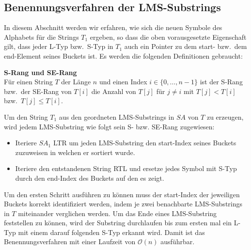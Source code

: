 \subsection{ Benennungsverfahren der LMS-Substrings}

In diesem Abschnitt werden wir erfahren, wie sich die neuen Symbole des Alphabets für die Strings $T_1$ ergeben, so dass die oben vorausgesetzte Eigenschaft gilt, dass jeder L-Typ bzw.\ S-Typ in $T_1$ auch ein Pointer zu dem start- bzw.\ dem end-Element seines Buckets ist. Es werden die folgenden Definitionen gebraucht:

\begin{definition}\textbf{S-Rang und SE-Rang}\\
Für einen String $T$ der Länge $n$ und einen Index $i \in \{0, \ldots, n-1\}$ ist der S-Rang bzw.\ der SE-Rang von $T[i]$ die Anzahl von $T[j]$ für $j \neq i$ mit $T[j] < T[i]$ bzw.\ $T[j] \leq T[i]$. 
\end{definition}

Um den String $T_1$ aus den geordneten LMS-Substrings in $SA$ von $T$ zu erzeugen, wird jedem LMS-Substring wie folgt sein S- bzw. SE-Rang zugewiesen:

\begin{itemize}
\item Iteriere $SA_1$ LTR um jeden LMS-Substring den start-Index seines Buckets zuzuweisen in welchen er sortiert wurde.
\item Iteriere den entstandenen String RTL und ersetze jedes Symbol mit S-Typ durch den end-Index des Buckets auf den es zeigt.
\end{itemize}

Um den ersten Schritt ausführen zu können muss der start-Index der jeweiligen Buckets korrekt identifiziert werden, indem je zwei benachbarte LMS-Substrings in $T$ miteinander verglichen werden. Um das Ende eines LMS-Substring feststellen zu können, wird der Substring durchlaufen bis zum ersten mal ein L-Typ mit einem darauf folgenden S-Typ erkannt wird. Damit ist das Benennungsverfahren mit einer Laufzeit von $\mathcal O(n)$ ausführbar.
